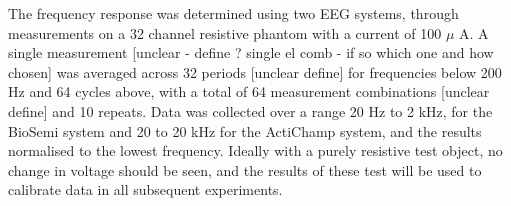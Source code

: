 The frequency response was determined using two EEG systems, through measurements on a 32 channel resistive phantom with a current of 100 $\mu$ A. A single measurement [unclear - define ? single el comb - if so which one and how chosen] was averaged across 32 periods [unclear define] for frequencies below 200 Hz and 64 cycles above, with a total of 64 measurement combinations [unclear define] and 10 repeats. Data was collected over a range 20 Hz to 2 kHz, for the BioSemi system and 20 to 20 kHz for the ActiChamp system, and the results normalised to the lowest frequency.  Ideally with a purely resistive test object, no change in voltage should be seen, and the results of these test will be used to calibrate data in all subsequent experiments.